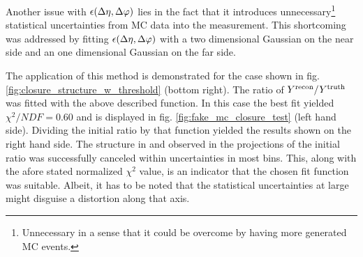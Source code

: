 Another issue with $\epsilon(\Delta\eta, \Delta\varphi)$ lies in the fact that it introduces unnecessary\footnote{Unnecessary in a sense that it could be overcome by having more generated MC events.} statistical uncertainties from MC data into the measurement. This shortcoming was addressed by fitting $\epsilon(\Delta\eta, \Delta\varphi)$ with a two dimensional Gaussian on the near side and an one dimensional Gaussian on the far side.

The application of this method is demonstrated for the case shown in fig. \ref{fig:closure_structure_w_threshold} (bottom right). The ratio of $Y^{\text{recon}} / Y^{\text{truth}}$ was fitted with the above described function. In this case the best fit yielded $\chi ^2 / NDF = 0.60$ and is displayed in fig. \ref{fig:fake_mc_closure_test} (left hand side). Dividing the initial ratio by that function yielded the results shown on the right hand side. The structure in \deta and \dphi observed in the projections of the initial ratio was successfully canceled within uncertainties in most bins. This, along with the afore stated normalized $\chi ^2$ value,  is an indicator that the chosen fit function was suitable. Albeit, it has to be noted that the statistical uncertainties at large \deta might disguise a distortion along that axis.

